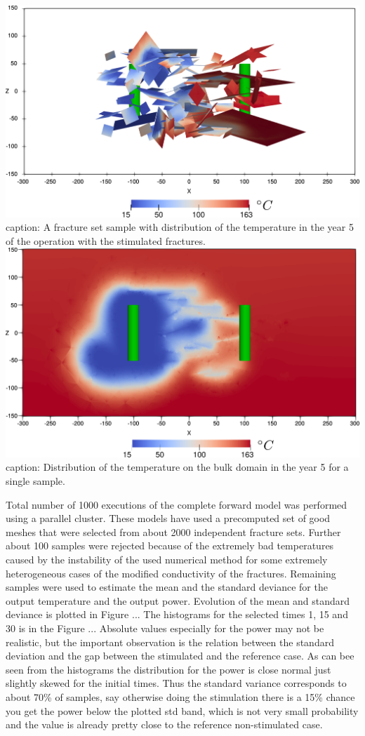 \documentclass{article}
\begin{document}
\includegraphics[width=\textwidth]{sample_6_bulk_t5_fr_final.pdf}
caption:
A fracture set sample with distribution of the temperature in the year 5 of the operation with the stimulated fractures.
\includegraphics[width=\textwidth]{sample_6_bulk_t5_final.pdf}
caption:
Distribution of the temperature on the bulk domain in the year 5 for a single sample.


Total number of 1000 executions of the complete forward model was performed using a parallel cluster. These models have used a precomputed set of good meshes that were selected from about 2000 independent fracture sets.
Further about 100 samples were rejected because of the extremely bad temperatures caused by the instability of the used numerical method for some extremely heterogeneous cases of the modified conductivity of the fractures.
Remaining samples were used to estimate the mean and the standard deviance for the output temperature and the output power. Evolution of the mean and standard deviance is plotted in Figure ...
The histograms for the selected times 1, 15 and 30 is in the Figure ...
Absolute values especially for the power may not be realistic, but the important observation is the relation between the standard deviation and the gap between the stimulated and the reference case. As can bee seen from the histograms the distribution  for the power is close normal just slightly skewed for the initial times. Thus the standard variance corresponds to about 70\% of samples, say otherwise doing the stimulation
there is a 15\% chance you get the power below the plotted std band, which is not very small probability and the value is already pretty close to the reference non-stimulated case.
\end{document}
